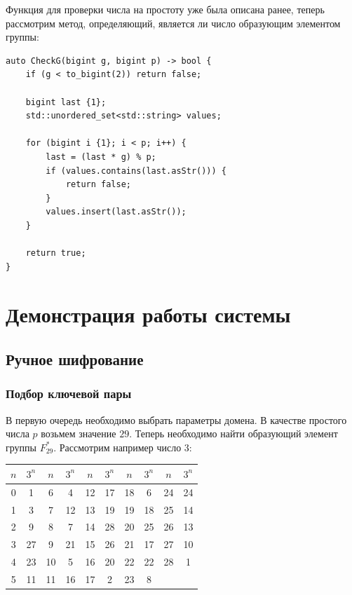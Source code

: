 \documentclass[a4paper]{article}
\begin{document}
  Функция для проверки числа на простоту уже была описана ранее, теперь рассмотрим метод,
  определяющий, является ли число образующим элементом группы:

  \begin{verbatim}
auto CheckG(bigint g, bigint p) -> bool {
    if (g < to_bigint(2)) return false;

    bigint last {1};
    std::unordered_set<std::string> values;

    for (bigint i {1}; i < p; i++) {
        last = (last * g) % p;
        if (values.contains(last.asStr())) {
            return false;
        }
        values.insert(last.asStr());
    }

    return true;
}
  \end{verbatim}

  \section{Демонстрация работы системы}

  \subsection{Ручное шифрование}

  \subsubsection{Подбор ключевой пары}

  В первую очередь необходимо выбрать параметры домена. В качестве простого числа $p$
  возьмем значение $29$. Теперь необходимо найти образующий элемент группы $F_{29}^*$.
  Рассмотрим например число $3$:

  \begin{center}
    \begin{tabular}{| c | c | c | c | c | c | c | c | c | c |}
        \hline
        $n$ & $3^n$ & 
        $n$ & $3^n$ & 
        $n$ & $3^n$ & 
        $n$ & $3^n$ & 
        $n$ & $3^n$  \\
        \hline
        0 &  1 &  6 &  4 & 12 & 17 & 18 & 6& 24 & 24\\
        \hline
        1 &  3 &  7 & 12 & 13 & 19 & 19 &18 & 25& 14\\
        \hline
        2 &  9 &  8 &  7 & 14 & 28 & 20 &25 & 26 &13 \\
        \hline
        3 & 27 & 9 &  21 & 15 & 26 & 21 & 17& 27 & 10\\
        \hline
        4 &  23 & 10 & 5 & 16 & 20 & 22 & 22& 28 & 1\\
        \hline
        5 & 11 & 11 & 16 & 17 & 2 & 23 &8 & & \\
        \hline
    \end{tabular}
  \end{center}
\end{document}
